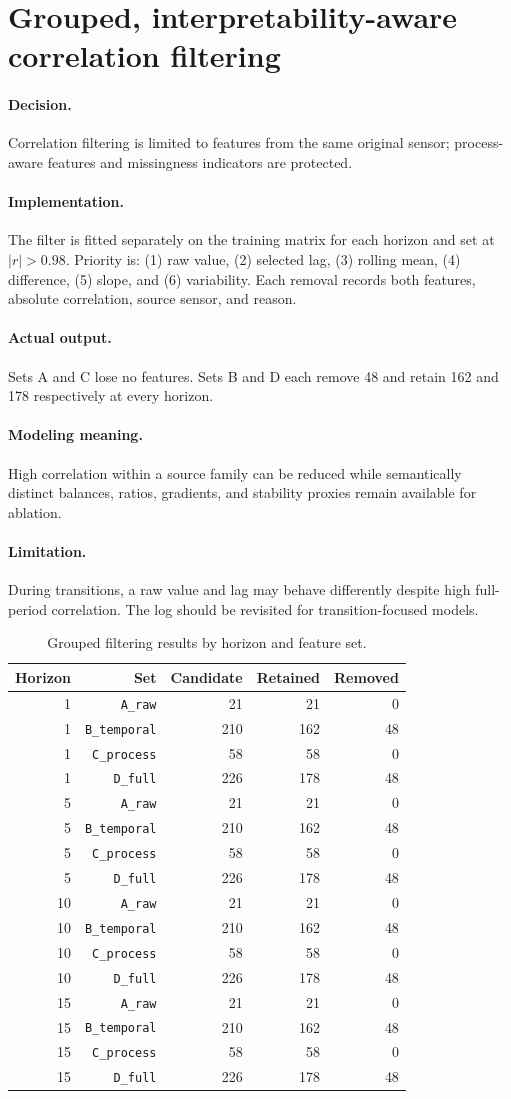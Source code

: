 \documentclass[10pt,a4paper]{article}
\newcommand{\decision}{\paragraph{Decision.}}
\newcommand{\implementation}{\paragraph{Implementation.}}
\newcommand{\actual}{\paragraph{Actual output.}}
\newcommand{\modelmeaning}{\paragraph{Modeling meaning.}}
\newcommand{\limitation}{\paragraph{Limitation.}}
\begin{document}
\section{Grouped, interpretability-aware correlation filtering}
\decision Correlation filtering is limited to features from the same original sensor; process-aware features and missingness indicators are protected.
\implementation The filter is fitted separately on the training matrix for each horizon and set at $|r|>0.98$. Priority is: (1) raw value, (2) selected lag, (3) rolling mean, (4) difference, (5) slope, and (6) variability. Each removal records both features, absolute correlation, source sensor, and reason.
\actual Sets A and C lose no features. Sets B and D each remove 48 and retain 162 and 178 respectively at every horizon.
\modelmeaning High correlation within a source family can be reduced while semantically distinct balances, ratios, gradients, and stability proxies remain available for ablation.
\limitation During transitions, a raw value and lag may behave differently despite high full-period correlation. The log should be revisited for transition-focused models.


\begin{table}[H]
\centering
\small
\begin{tabular}{rrrrr}
\toprule
Horizon & Set & Candidate & Retained & Removed \\
\midrule
1 & \nolinkurl{A_raw} & 21 & 21 & 0 \\
1 & \nolinkurl{B_temporal} & 210 & 162 & 48 \\
1 & \nolinkurl{C_process} & 58 & 58 & 0 \\
1 & \nolinkurl{D_full} & 226 & 178 & 48 \\
5 & \nolinkurl{A_raw} & 21 & 21 & 0 \\
5 & \nolinkurl{B_temporal} & 210 & 162 & 48 \\
5 & \nolinkurl{C_process} & 58 & 58 & 0 \\
5 & \nolinkurl{D_full} & 226 & 178 & 48 \\
10 & \nolinkurl{A_raw} & 21 & 21 & 0 \\
10 & \nolinkurl{B_temporal} & 210 & 162 & 48 \\
10 & \nolinkurl{C_process} & 58 & 58 & 0 \\
10 & \nolinkurl{D_full} & 226 & 178 & 48 \\
15 & \nolinkurl{A_raw} & 21 & 21 & 0 \\
15 & \nolinkurl{B_temporal} & 210 & 162 & 48 \\
15 & \nolinkurl{C_process} & 58 & 58 & 0 \\
15 & \nolinkurl{D_full} & 226 & 178 & 48 \\
\bottomrule
\end{tabular}
\caption{Grouped filtering results by horizon and feature set.}
\end{table}
\end{document}
